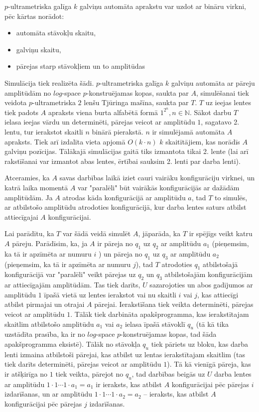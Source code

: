 \documentclass{ludis}
\begin{document}
$p$-ultrametriska galīga $k$ galviņu automāta aprakstu var uzdot ar bināru virkni, pēc kārtas norādot:
\begin{itemize}
	\item automāta stāvokļu skaitu,
	\item galviņu skaitu,
	\item pārejas starp stāvokļiem un to amplitūdas %
\end{itemize}

Simulācija tiek realizēta šādi. $p$-ultrametriska galīga $k$ galviņu automāta ar pāreju amplitūdām no $log$-space $p$-konstruējamas kopas, saukta par $A$, simulēšanai tiek veidota $p$-ultrametriska $2$ lenšu Tjūringa mašīna, saukta par $T$. $T$ uz ieejas lentes tiek padots $A$ apraksts viena burta alfabētā formā $1^{2^n}, n \in \mathbb{N}$. Sākot darbu $T$ ielasa ieejas vārdu un determinēti, pārejas veicot ar amplitūdu $1$, sagatavo 2. lentu, tur ierakstot skaitli $n$ binārā pierakstā. $n$ ir simulējamā automāta $A$ apraksts. Tiek arī izdalīta vieta apjomā $O(k \cdot n)$ $k$ skaitītājiem, kas norādīs $A$ galviņu pozīcijas. Tālākajā simulācijas gaitā tiks izmantota tikai 2. lente (lai arī rakstīšanai var izmantot abas lentes, ērtībai sauksim 2. lenti par darba lenti).

Atceramies, ka $A$ savas darbības laikā iziet cauri vairāku konfigurāciju virknei, un katrā laika momentā $A$ var "paralēli" būt vairākās konfigurācijās ar dažādām amplitūdām.
Ja $A$ atrodas kāda konfigurācijā ar amplitūdu $a$, tad $T$ to simulēs, ar atbilstošo amplitūdu atrodoties konfigurācijā, kur darba lentes saturs atbilst attiecīgajai $A$ konfigurācijai.

Lai parādītu, ka $T$ var šādā veidā simulēt $A$, jāparāda, ka $T$ ir spējīgs veikt katru $A$ pāreju. Parādīsim, ka, ja $A$ ir pāreja no $q_1$ uz $q_2$ ar amplitūdu $a_1$ (pieņemsim, ka tā ir apzīmēta ar numuru $i$ ) un pāreja no $q_1$ uz $q_3$ ar amplitūdu $a_2$ (pieņemsim, ka tā ir apzīmēta ar numuru $j$), tad $T$ atrodoties $q_1$ atbilstošajā konfigurācijā var "paralēli" veikt pārejas uz $q_2$ un $q_3$ atbilstošajām konfigurācijām ar attiecīgajām amplitūdām. Tas tiek darīts, $U$ sazarojoties un abos gadījumos ar amplitūdu $1$ īpašā vietā uz lentes ierakstot vai nu skaitli $i$ vai $j$, kas attiecīgi atbilst pirmajai un otrajai $A$ pārejai. Ierakstīšana tiek veikta determinēti, pārejas veicot ar amplitūdu $1$. Tālāk tiek darbināta apakšprogramma, kas ierakstītajam skaitlim atbilstošo amplitūdu $a_1$ vai $a_2$ ielasa īpašā stāvoklī $q_u$ (tā kā tika uzstādīta prasība, ka ir no $log$-space $p$-konstruējamas kopas, tad šāda apakšprogramma eksistē). Tālāk no stāvokļa $q_u$ tiek pāriets uz bloku, kas darba lenti izmaina atbilstoši pārejai, kas atbilst uz lentas ierakstītajam skaitlim (tas tiek darīts determinēti, pārejas veicot ar amplitūdu $1$). Tā kā vienīgā pāreja, kas ir atšķirīga no $1$ tiek veikta, pārejot no $q_u$, tad darbības beigās uz $U$ darba lentes ar amplitūdu $1 \cdot 1 \cdots 1 \cdot a_1 = a_1$ ir ieraksts, kas atbilst $A$ konfigurācijai pēc pārejas $i$ izdarīšanas, un ar amplitūdu $1 \cdot 1 \cdots 1 \cdot a_2 = a_2$ -- ieraksts, kas atbilst $A$ konfigurācijai pēc pārejas $j$ izdarīšanas.
\end{document}
